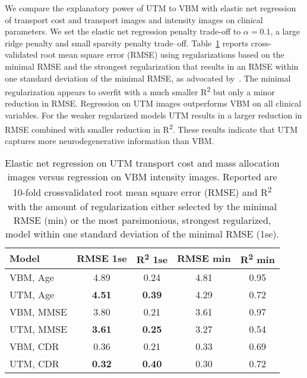 \documentclass{llncs}
\begin{document}
We compare the explanatory power of UTM to VBM with elastic net
regression~\cite{Zou05regularizationand} of transport cost and transport images
and intensity images on clinical parameters. We set the elastic net regression
penalty trade-off to $\alpha=0.1$, a large ridge penalty and small sparsity
penalty trade--off.  Table~\ref{fig:prediction} reports cross-validated root
mean square error (RMSE) using regularizations based on the minimal RMSE and
the strongest regularization that results in an RMSE within one standard
deviation of the minimal RMSE, as advocated by~\cite{Zou05regularizationand}.
The minimal regularization appears to overfit with a much smaller
R\textsuperscript{2}  but only a minor reduction in RMSE. Regression on UTM
images outperforms VBM on all clinical variables. For the weaker regularized
models UTM results in a larger reduction in RMSE combined with smaller
reduction in R\textsuperscript{2}.  These results indicate that UTM captures
more neurodegenerative information than VBM.
\begin{table}[h!]
\centering
\begin{tabular}{l|cc|cc}
  \parbox[b][4mm]{25mm }{Model  }  &
  \parbox[b][4mm]{17mm }{\centering RMSE 1se }  & 
  \parbox[b][4mm]{15mm }{\centering R\textsuperscript{2}  1se} & 
  \parbox[b][4mm]{17mm }{\centering RMSE min }  & 
  \parbox[b][4mm]{15mm }{\centering R\textsuperscript{2}  min} 
        \\ \hline \hline
  VBM, Age   & 4.89        & 0.24         & 4.81  & 0.95 \\
  UTM, Age   & {\bf 4.51}  & {\bf 0.39 }  & 4.29  & 0.72 \\ \hline
  VBM, MMSE  & 3.80        & 0.21         & 3.61  & 0.97 \\
  UTM, MMSE  & {\bf3.61 }  & {\bf 0.25}   & 3.27  & 0.54 \\ \hline
  VBM, CDR   & 0.36        & 0.21         & 0.33  & 0.69 \\
  UTM, CDR   & {\bf 0.32 } & {\bf 0.40 }  & 0.30  & 0.72 \\
\end{tabular} 
\caption{ \label{fig:prediction}  Elastic net regression on UTM transport cost
  and mass allocation images versus regression on VBM intensity images.
  Reported are 10-fold crossvalidated root mean square error (RMSE) and
  R\textsuperscript{2} with the amount of regularization either selected by the
  minimal RMSE (min) or the most parsimonious, strongest regularized, model
  within one standard deviation of the minimal RMSE (1se). 
  \vspace{-5mm}}
\end{table}
\end{document}
